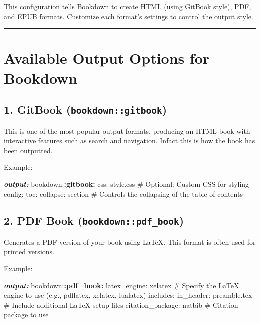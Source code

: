 \documentclass[
]{book}
\newenvironment{Shaded}{\begin{snugshade}}{\end{snugshade}}
\newcommand{\AnnotationTok}[1]{\textcolor[rgb]{0.56,0.35,0.01}{\textbf{\textit{#1}}}}
\newcommand{\NormalTok}[1]{#1}
\newcommand{\SpecialCharTok}[1]{\textcolor[rgb]{0.81,0.36,0.00}{\textbf{#1}}}
\theoremstyle{definition}
\theoremstyle{definition}
\theoremstyle{definition}
\theoremstyle{definition}
\theoremstyle{remark}
\begin{document}
This configuration tells Bookdown to create HTML (using GitBook style), PDF, and EPUB formats. Customize each format's settings to control the output style.

\begin{center}\rule{0.5\linewidth}{0.5pt}\end{center}

\section{Available Output Options for Bookdown}\label{available-output-options-for-bookdown}

\subsection{\texorpdfstring{1. GitBook (\texttt{bookdown::gitbook})}{1. GitBook (bookdown::gitbook)}}\label{gitbook-bookdowngitbook}

This is one of the most popular output formats, producing an HTML book with interactive features such as search and navigation. Infact this is how the book has been outputted.

Example:

\begin{Shaded}
\begin{Highlighting}[]
\AnnotationTok{output:}
\NormalTok{  bookdown:}\SpecialCharTok{:gitbook:}
\NormalTok{    css: style.css  \# Optional: Custom CSS for styling}
\NormalTok{    config:}
\NormalTok{      toc:}
\NormalTok{        collapse: section  \# Controls the collapsing of the table of contents}
\end{Highlighting}
\end{Shaded}

\subsection{\texorpdfstring{2. PDF Book (\texttt{bookdown::pdf\_book})}{2. PDF Book (bookdown::pdf\_book)}}\label{pdf-book-bookdownpdf_book}

Generates a PDF version of your book using LaTeX. This format is often used for printed versions.

Example:

\begin{Shaded}
\begin{Highlighting}[]
\AnnotationTok{output:}
\NormalTok{  bookdown:}\SpecialCharTok{:pdf\_book:}
\NormalTok{    latex\_engine: xelatex  \# Specify the LaTeX engine to use (e.g., pdflatex, xelatex, lualatex)}
\NormalTok{    includes:}
\NormalTok{      in\_header: preamble.tex  \# Include additional LaTeX setup files}
\NormalTok{    citation\_package: natbib  \# Citation package to use}
\end{Highlighting}
\end{Shaded}
\end{document}
